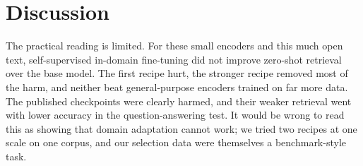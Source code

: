 \documentclass[11pt]{article}
\begin{document}
\begin{table}[t]\centering\small

\caption{PubMedQA yes/no (442 questions), base Mistral-7B-Instruct-v0.2 with top-1 retrieved abstract. Hit@1 = gold abstract retrieved. Difference vs. no context with paired bootstrap CI.}\label{tab:rag2}
\end{table}

\section{Discussion}
The practical reading is limited. For these small encoders and this much open text, self-supervised in-domain fine-tuning did not improve zero-shot retrieval over the base model. The first recipe hurt, the stronger recipe removed most of the harm, and neither beat general-purpose encoders trained on far more data. The published checkpoints were clearly harmed, and their weaker retrieval went with lower accuracy in the question-answering test. It would be wrong to read this as showing that domain adaptation cannot work; we tried two recipes at one scale on one corpus, and our selection data were themselves a benchmark-style task.
\end{document}
